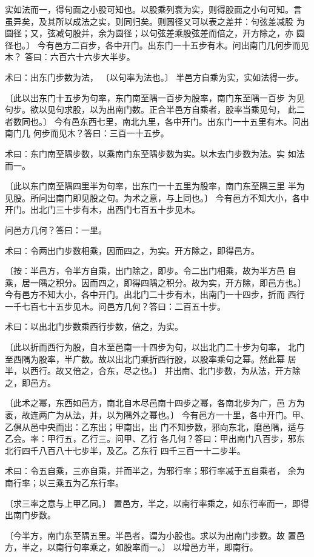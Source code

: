 \documentclass[a4paper,12pt,UTF8,twoside]{ctexbook}
\begin{document}
实如法而一，得句面之小股可知也。以股乘列衰为实，则得股面之小句可知。言 虽异矣，及其所以成法之实，则同归矣。则圆径又可以表之差并：句弦差减股 为圆径；又，弦减句股并，余为圆径；以句弦差乘股弦差而倍之，开方除之，亦 圆径也。〕 今有邑方二百步，各中开门。出东门一十五步有木。问出南门几何步而见木？ 答曰：六百六十六步大半步。

术曰：出东门步数为法， 〔以句率为法也。〕 半邑方自乘为实，实如法得一步。

〔此以出东门十五步为句率，东门南至隅一百步为股率，南门东至隅一百步 为见句步。欲以见句求股，以为出南门数。正合半邑方自乘者，股率当乘见句， 此二者数同也。〕 今有邑东西七里，南北九里，各中开门。出东门一十五里有木。问出南门几 何步而见木？答曰：三百一十五步。

术曰：东门南至隅步数，以乘南门东至隅步数为实。以木去门步数为法。实 如法而一。

〔此以东门南至隅四里半为句率，出东门一十五里为股率，南门东至隅三里 半为见股。所问出南门即见股之句。为术之意，与上同也。〕 今有邑方不知大小，各中开门。出北门三十步有木，出西门七百五十步见木。

问邑方几何？答曰：一里。

术曰：令两出门步数相乘，因而四之，为实。开方除之，即得邑方。

〔按：半邑方，令半方自乘，出门除之，即步。令二出门相乘，故为半方邑 自乘，居一隅之积分。因而四之，即得四隅之积分。故为实，开方除，即邑方也。〕 今有邑方不知大小，各中开门。出北门二十步有木，出南门一十四步，折而 西行一千七百七十五步见木。问邑方几何？答曰：二百五十步。

术曰：以出北门步数乘西行步数，倍之，为实。

〔此以折而西行为股，自木至邑南一十四步为句，以出北门二十步为句率， 北门至西隅为股率，半广数。故以出北门乘折西行股，以股率乘句之幂。然此幂 居半，以西行。故又倍之，合东，尽之也。〕 并出南、北门步数，为从法，开方除之，即邑方。

〔此术之幂，东西如邑方，南北自木尽邑南十四步之幂，各南北步为广，邑 方为袤，故连两广为从法，并，以为隅外之幂也。〕 今有邑方一十里，各中开门。甲、乙俱从邑中央而出：乙东出；甲南出，出 门不知步数，邪向东北，磨邑隅，适与乙会。率：甲行五，乙行三。问甲、乙行 各几何？答曰：甲出南门八百步，邪东北行四千八百八十七步半，及乙。乙东行 四千三百一十二步半。

术曰：令五自乘，三亦自乘，并而半之，为邪行率；邪行率减于五自乘者， 余为南行率；以三乘五为乙东行率。

〔求三率之意与上甲乙同。〕 置邑方，半之，以南行率乘之，如东行率而一，即得出南门步数。

〔今半方，南门东至隅五里。半邑者，谓为小股也。求以为出南门步数。故 置邑方，半之，以南行句率乘之，如股率而一。〕 以增邑方半，即南行。
\end{document}
